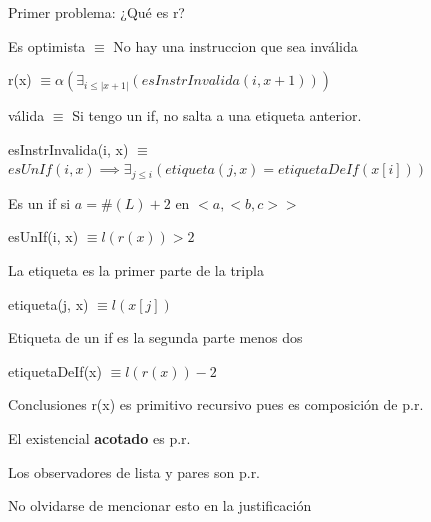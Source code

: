 \documentclass{beamer}
\begin{document}
\begin{frame}
	Primer problema: ¿Qué es r?
	
	\bigskip
	\pause

	\hfill Es optimista $\equiv$ No hay una instruccion que sea inválida 

	\medskip
	\pause


	r(x) $\equiv \alpha(\exists_{i \leq |x+1|}(esInstrInvalida(i, x+1))) $

	\bigskip
	\pause


	\hfill válida $\equiv$ Si tengo un if, no salta a una etiqueta anterior. 

	\medskip
	\pause


	esInstrInvalida(i, x) $ \equiv$ \\
	$esUnIf(i, x) \implies \exists_{j \leq i}(etiqueta(j, x) = etiquetaDeIf(x[i]) ) $

	\bigskip

	
\end{frame}
\begin{frame}
	
	\hfill Es un if si $a = \#(L) + 2$ en $<a, <b, c> >$ 

	\medskip
	\pause

	esUnIf(i, x) $ \equiv l(r(x)) > 2$

	\bigskip
	\pause

	\hfill La etiqueta es la primer parte de la tripla

	\medskip
	\pause

	etiqueta(j, x) $ \equiv l(x[j])$

	\bigskip
	\pause

	\hfill Etiqueta de un if es la segunda parte menos dos

	\medskip
	\pause

	etiquetaDeIf(x) $ \equiv l(r(x)) - 2$
\end{frame}

\begin{frame}{Conclusiones}
	r(x) es primitivo recursivo pues es composición de p.r.

	\bigskip

	El existencial \textbf{acotado} es p.r.

	\bigskip

	Los observadores de lista y pares son p.r.

	\bigskip
	\bigskip
	\bigskip

	No olvidarse de mencionar esto en la justificación

\end{frame}
\end{document}
